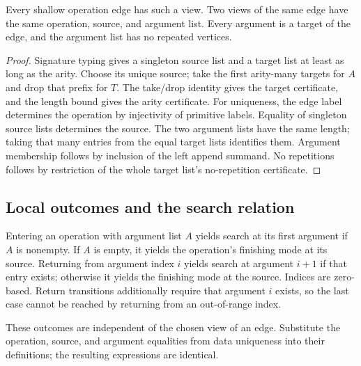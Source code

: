 \begin{lemma}
Every shallow operation edge has such a view. Two views of the same edge have
the same operation, source, and argument list. Every argument is a target of
the edge, and the argument list has no repeated vertices.
\end{lemma}
\begin{proof}
Signature typing gives a singleton source list and a target list at least as
long as the arity. Choose its unique source; take the first arity-many targets
for $A$ and drop that prefix for $T$. The take/drop identity gives the target
certificate, and the length bound gives the arity certificate.
For uniqueness, the edge label determines the operation by injectivity of
primitive labels. Equality of singleton source lists determines the source.
The two argument lists have the same length; taking that many entries from the
equal target lists identifies them. Argument membership follows by inclusion
of the left append summand. No repetitions follows by restriction of the
whole target list's no-repetition certificate.
\end{proof}

\subsection{Local outcomes and the search relation}
\begin{definition}\label{term:search-outcomes}
Entering an operation with argument list $A$ yields search at its first
argument if $A$ is nonempty. If $A$ is empty, it yields the operation's finishing
mode at its source. Returning from argument index $i$ yields search at argument
$i+1$ if that entry exists; otherwise it yields the finishing mode at the
source. Indices are zero-based. Return transitions additionally require that
argument $i$ exists, so the last case cannot be reached by returning from an
out-of-range index.
\end{definition}
These outcomes are independent of the chosen view of an edge. Substitute the
operation, source, and argument equalities from data uniqueness into their
definitions; the resulting expressions are identical.

